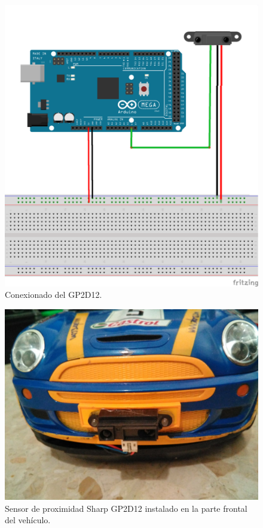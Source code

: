  \begin{figure}[H]
  \begin{center}
    \includegraphics[scale=0.6]{imagenes/sharp_conexionado.png}
  \end{center}
  \caption{Conexionado del GP2D12.}
  \label{figura:pines_sharp}
\end{figure}


 \begin{figure}[H]
  \begin{center}
    \includegraphics[scale=0.2]{imagenes/robot/sharp_instalado.jpg}
  \end{center}
  \caption{Sensor de proximidad Sharp GP2D12 instalado en la parte frontal del vehículo.}
  \label{figura:sensor_mq_2_potenciometro}
\end{figure}


